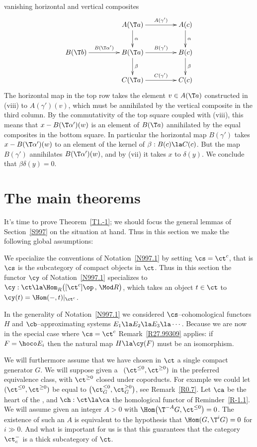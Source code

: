 \documentclass[11pt]{amsart}
\begin{document}
vanishing horizontal and vertical composites 
\[\xymatrix@C+20pt{
 & A(\T a)\ar[d]^-{\alpha}\ar[r]^-{A(\gamma')} &
A(c)\ar[d]^-{\alpha} \\
B(\T b)\ar[r]^-{B(\T\alpha')}  &
B(\T a)\ar[d]^-{\beta}\ar[r]^-{B(\gamma')}  &
 B(c)\ar[d]^-{\beta} \\
 &C(\T a)\ar[r]^-{C(\gamma')} &  C(c)
}\]
The horizontal map in the top row
takes the element $v\in A(\T a)$ constructed in (viii) to
$A(\gamma')(v)$, which must be annihilated by the vertical composite
in the third column. By the commutativity of the top square coupled
with (viii), this means that $x-B(\T \alpha')(w)$ is an element
of $B(\T a)$ annihilated by the equal composites in the bottom square.
In particular the horizontal map $B(\gamma')$ takes
$x-B(\T \alpha')(w)$ to an element of the kernel
of $\beta:B(c)\la C(c)$. But the map $B(\gamma')$ annihilates
$B(\T \alpha')(w)$, and by (vii) it takes $x$ to $\delta(y)$. We conclude
that $\beta\delta(y)=0$.
\eprf


\section{The main theorems}
\label{S37}

It's time to prove Theorem~\ref{T1.-1}; we should
focus the general lemmas of Section~\ref{S997}
on the situation at hand. Thus 
in this section we make the following global assumptions:

We specialize the conventions of Notation~\ref{N997.1}
by setting $\cs=\ct^c$, that
is $\cs$ is the subcategory of compact objects in $\ct$.
Thus in this section the functor $\cy$ of Notation~\ref{N997.1}
specializes to
$\cy:\ct\la\Hom_R^{}\big([\ct^c]\op\,,\,\Mod R\big)$,
which takes
an object $t\in\ct$ to $\cy(t)=\Hom(-,t)|_{\ct^c}$.

In the generality of Notation~\ref{N997.1}
we considered $\cs$--cohomological functors $H$ and 
$\cb$--approximating systems $E_1\la E_2\la E_3\la\cdots$.
Because we are now in the special case where $\cs=\ct^c$
Remark~\ref{R27.99309} applies: if $F=\hoco E_i$ then the
natural map $H\la\cy(F)$ must be an isomorphism.

We will furthermore assume that we have chosen in $\ct$
a single compact generator $G$.
We will suppose given
a \tstr\ $(\ct^{\leq0},\ct^{\geq0})$ in the preferred
equivalence class, with $\ct^{\geq0}$ closed under coporducts.
For
example we could let $(\ct^{\leq0},\ct^{\geq0})$ be equal to
$\big(\ct_G^{\leq0},\ct_G^{\geq0}\big)$, see Remark~\ref{R0.7}.
Let $\ca$ be the heart of the \tstr, and
 $\ch:\ct\la\ca$ the homological functor of Reminder~\ref{R-1.1}.
We will assume given an integer $A>0$ with
$\Hom\big(\T^{-A}G,\ct^{\leq0}\big)=0$. The existence of
such an $A$ is equivalent to the hypothesis that $\Hom(G,\T^iG)=0$
for $i\gg0$. And what is important for us
is that this guarantees that the category $\ct^-_c$ is a thick
subcategory of $\ct$.
\end{document}
